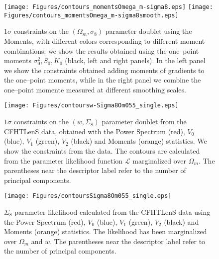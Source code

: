 \documentclass[reprint,aps,prd,superscriptaddress,showkeys,showpacs]{revtex4-1}
\begin{document}
\begin{figure*}
\begin{center}
\texttt{[image: Figures/contours\_momentsOmega\_m-sigma8.eps]}
\texttt{[image: Figures/contours\_momentsOmega\_m-sigma8smooth.eps]}
\end{center}
\caption{$1\sigma$ constraints on the $(\Omega_m,\sigma_8)$ parameter doublet using the Moments, with different colors corresponding to different moment combinations: we show the results obtained using the one--point moments $\sigma_0^2,S_0,K_0$ (black, left and right panels). In the left panel we show the constraints obtained adding moments of gradients to the one--point moments, while in the right panel we combine the one--point momente measured at different smoothing scales.}
\label{contoursMoments}
\end{figure*}

\begin{figure}
\begin{center}
\texttt{[image: Figures/contoursw-Sigma8Om055\_single.eps]}
\end{center}
\caption{$1\sigma$ constraints on the $(w,\Sigma_8)$ parameter doublet from the CFHTLenS data, obtained with the Power Spectrum (red), $V_0$ (blue), $V_1$ (green), $V_2$ (black) and Moments (orange) statistics. We show the constraints from the data. The contours are calculated from the parameter likelihood function $\mathcal{L}$ marginalized over $\Omega_m$. The parentheses near the descriptor label refer to the number of principal components.}
\label{contours3singleRep}
\end{figure}

\begin{figure}
\begin{center}
\texttt{[image: Figures/contoursSigma8Om055\_single.eps]}
\end{center}
\caption{$\Sigma_8$ parameter likelihood calculated from the CFHTLenS data using the Power Spectrum (red), $V_0$ (blue), $V_1$ (green), $V_2$ (black) and Moments (orange) statistics. The likelihood has been marginalized over $\Omega_m$ and $w$. The parentheses near the descriptor label refer to the number of principal components.}
\label{likelihoodSi8single}
\end{figure}
\end{document}
